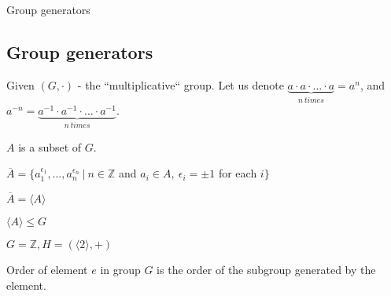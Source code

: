 \documentclass{beamer}
\begin{document}
\begin{frame}{Group generators}
	\subsection{Group generators}
	\begin{definition}
		Given $(G, \cdot)$ - the ``multiplicative`` group. \newline
		Let us denote $\underbrace{a \cdot a \cdot \ldots \cdot a}_{n\ times} = a^n$, and \newline
		$a^{-n} = \underbrace{a^{-1} \cdot a^{-1} \cdot \ldots \cdot a^{-1}}_{n\ times}$.
	\end{definition}
	\begin{definition}
		$A$ is a subset of $G$.

		$\overline{A} = \{a_1^{\epsilon_1},\ldots, a_n^{\epsilon_n}\ \vert\ n \in \mathbb{Z}$ and $a_i \in A,\ 
		\epsilon_i = \pm 1$ for each $i \}$
		
		$\overline{A} = \langle A \rangle$ 
	\end{definition}
	$\langle A \rangle \le G$
	\begin{example}
		$G = \mathbb{Z}, H = (\langle 2 \rangle, +)$
	\end{example}
	\begin{definition}
		Order of element $e$ in group $G$ is the order of the subgroup generated by the element.
	\end{definition}
\end{frame}

\end{document}
